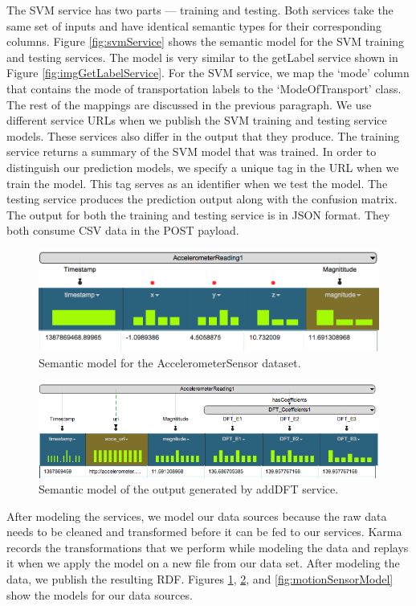 The SVM service has two parts --- training and testing. Both  services take the same set of inputs and have identical semantic types for their corresponding columns. Figure \ref{fig:svmService} shows the semantic model for the SVM training and testing services. The model is very similar to the getLabel service shown in  Figure \ref{fig:imgGetLabelService}. For the SVM service, we map the `mode' column that contains the mode of transportation labels to the `ModeOfTransport' class. The rest of the mappings are discussed in the previous paragraph. We use different service URLs when we publish the SVM training and testing service models. These services also differ in the output that they produce. The training service returns a summary of the SVM model that was trained. In order to distinguish our prediction models, we specify a unique tag in the URL when we train the model. This tag serves as an identifier when we test the model. The testing service produces the prediction output along with the confusion matrix. The output for both the training and testing service is in JSON format. They both consume CSV data in the POST payload.

\begin{figure}[ht!]
\centering
\includegraphics[width=117mm]{img/AccelerometerReadingModel}
\caption{Semantic model for the AccelerometerSensor dataset.\label{fig:AccelerometerReadingModel}}
\end{figure}

\begin{figure}[b]
\centering
\includegraphics[width=177mm]{img/DFToutput}
\caption{Semantic model of the output generated by addDFT service. \label{fig:DFToutput}}
\end{figure}

After modeling the services, we model our data sources because the raw data needs to be cleaned and transformed before it can be fed to our services. Karma records the transformations that we perform while modeling the data and replays it when we apply the model on a new file from our data set. After modeling the data, we publish the resulting RDF. Figures \ref{fig:AccelerometerReadingModel}, \ref{fig:DFToutput}, and \ref{fig:motionSensorModel} show the models for our data sources.

